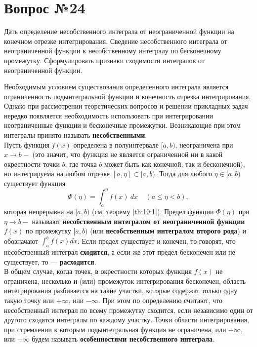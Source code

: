 \documentclass[12pt]{report}
\numberwithin{equation}{section}
\begin{document}
\newpage \section{Вопрос №24} %
\begin{framed}
Дать определение несобственного интеграла от неограниченной функции на конечном отрезке интегрирования. Сведение несобственного интеграла от неограниченной функции к несобственному интегралу по бесконечному промежутку. Сформулировать  признаки сходимости интегралов от неограниченной функции.
\end{framed}

Необходимым условием существования определенного интеграла является ограниченность подынтегральной функции и конечность отрезка интегрирования. Однако при рассмотрении теоретических вопросов и решении прикладных задач нередко появляется необходимость использовать при интегрировании неограниченные функции и бесконечные промежутки. Возникающие при этом интегралы принято называть \textbf{несобственными}.\\

Пусть функция $f(x)$ определена в полуинтервале $[a,b)$, неограничена при $x \to b-$ (это значит, что функция не является ограниченной ни в какой окрестности точки $b$, где точка $b$ может быть как конечной, так и бесконечной), но интегрируема на любом отрезке $[a,\eta] \subset [a,b)$. Тогда для любого $\eta \in [a,b)$ существует функция 
\[ \Phi(\eta) = \int_a^{\eta} f(x)~dx ~~~~~ (a \leqslant \eta < b),\]
которая непрерывна на $[a,b)$ (см. теорему \ref{th:10:1}). Предел функции $\Phi(\eta)$ при $\eta \to b-$ называют \textbf{несобственным интегралом от неограниченной функции} $f(x)$ по промежутку $[a,b)$ (или \textbf{несобственным интегралом второго рода}) и обозначают $\int_a^b f(x)dx$. Если предел существует и конечен, то говорят, что несобственный интеграл \textbf{сходится}, а если же этот предел бесконечен или не существует, то --- \textbf{расходится}.\\

В общем случае, когда точек, в окрестности которых функция $f(x)$ не ограничена, несколько и (или) промежуток интегрирования бесконечен, область интегрирования разбивается на такие участки, которые содержат только одну такую точку или $+\infty$, или $-\infty$. При этом по определению считают, что несобственный интеграл по всему промежутку сходится, если независимо один от другого сходятся интегралы по каждому участку. Точки области интегрирования, при стремлении к которым подынтегральная функция не ограничена, или $+\infty$, или $-\infty$ будем называть \textbf{особенностями несобственного интеграла}.\\
\end{document}
